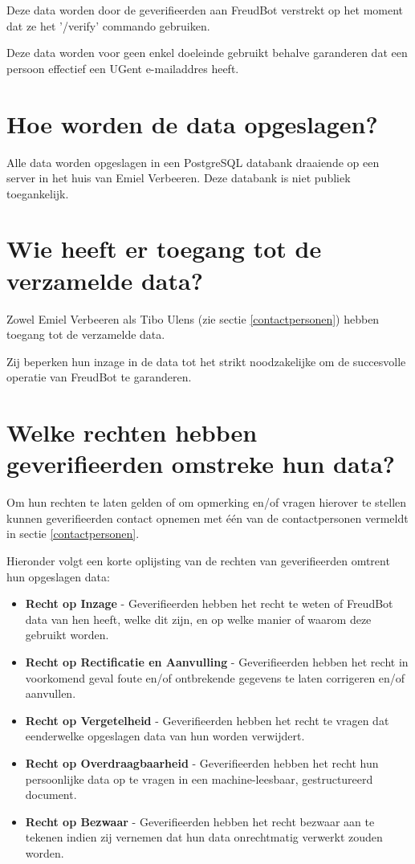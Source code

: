 \documentclass[12pt, a4paper]{article}
\begin{document}
	Deze data worden door de geverifieerden aan FreudBot verstrekt op het
	moment dat ze het '/verify' commando gebruiken.

	Deze data worden voor geen enkel doeleinde gebruikt behalve garanderen dat
	een persoon effectief een UGent e-mailaddres heeft.

	\section{Hoe worden de data opgeslagen?}
	Alle data worden opgeslagen in een PostgreSQL databank draaiende op een
	server in het huis van Emiel Verbeeren. Deze databank is niet publiek
	toegankelijk.

	\section{Wie heeft er toegang tot de verzamelde data?}
	Zowel Emiel Verbeeren als Tibo Ulens (zie sectie \ref{contactpersonen})
	hebben toegang tot de verzamelde data.

	Zij beperken hun inzage in de data tot het strikt noodzakelijke om de
	succesvolle operatie van FreudBot te garanderen.

	\section{Welke rechten hebben geverifieerden omstreke hun data?}
	Om hun rechten te laten gelden of om opmerking en/of vragen hierover te
	stellen kunnen geverifieerden contact opnemen met één van de
	contactpersonen vermeldt in sectie \ref{contactpersonen}.

	\vspace{12pt}
	Hieronder volgt een korte oplijsting van de rechten van geverifieerden
	omtrent hun opgeslagen data:

	\begin{itemize}
		\setlength{\itemsep}{0cm}
		\setlength{\parskip}{0cm}

		\item \textbf{Recht op Inzage} - Geverifieerden hebben het recht te
		weten of FreudBot data van hen heeft, welke dit zijn, en op welke
		manier of waarom deze gebruikt worden.
		\item \textbf{Recht op Rectificatie en Aanvulling} - Geverifieerden
		hebben het recht in voorkomend geval foute en/of ontbrekende gegevens
		te laten corrigeren en/of aanvullen.
		\item \textbf{Recht op Vergetelheid} - Geverifieerden hebben het recht
		te vragen dat eenderwelke opgeslagen data van hun worden verwijdert.
		\item \textbf{Recht op Overdraagbaarheid} - Geverifieerden hebben het
		recht hun persoonlijke data op te vragen in een machine-leesbaar,
		gestructureerd document.
		\item \textbf{Recht op Bezwaar} - Geverifieerden hebben het recht
		bezwaar aan te tekenen indien zij vernemen dat hun data onrechtmatig
		verwerkt zouden worden.
	\end{itemize}
\end{document}
